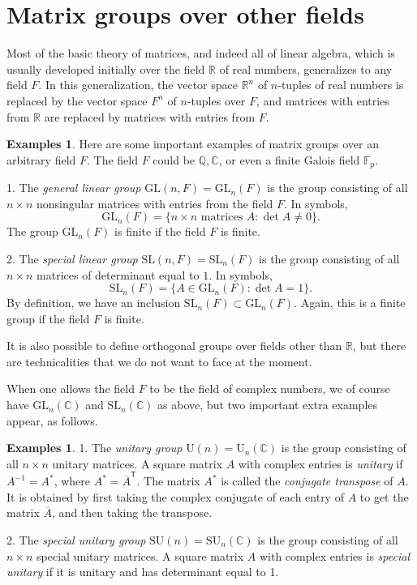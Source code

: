 \documentclass[11pt]{article}
\theoremstyle{definition}
\newtheorem{examples}[thm]{Examples}
\newcommand{\R}{\mathbb{R}} %
\newcommand{\C}{\mathbb{C}} %
\newcommand{\Q}{\mathbb{Q}} %
\newcommand{\F}{{\mathbb F}}
\newcommand{\GL}{\mathrm{GL}}
\newcommand{\SL}{\mathrm{SL}}
\newcommand{\U}{\mathrm{U}}
\newcommand{\SU}{\mathrm{SU}}
\newcommand{\transpose}{\mathsf{T}}
\begin{document}
\newpage
\section{Matrix groups over other fields}\noindent
Most of the basic theory of matrices, and indeed all of linear
algebra, which is usually developed initially over the field $\R$ of
real numbers, generalizes to any field $F$. In this
generalization, the vector space $\R^n$ of $n$-tuples of real numbers
is replaced by the vector space $F^n$ of $n$-tuples over $F$, and
matrices with entries from $\R$ are replaced by matrices with entries
from $F$.

\begin{examples}
Here are some important examples of matrix groups over an arbitrary
field $F$. The field $F$ could be $\Q, \C$, or even a finite Galois
field $\F_p$.

1. The \emph{general linear group}
$\GL(n,F) = \GL_n(F)$\index{GL@$\GL_n(F)$} is the group consisting of
all $n \times n$ nonsingular matrices with entries from the field
$F$. In symbols,
\[
  \GL_n(F) = \{ n \times n \text{ matrices } A : \det A \ne 0\}.
\]
The group $\GL_n(F)$ is finite if the field $F$ is finite. 

2. The \emph{special linear group} $\SL(n,
F) = \SL_n(F)$\index{SL@$\SL_n(F)$} is the group consisting of all $n
\times n$ matrices of determinant equal to $1$. In symbols,
\[
  \SL_n(F) = \{ A \in \GL_n(F) : \det A = 1 \}.
\]
By definition, we have an inclusion $\SL_n(F) \subset
\GL_n(F)$. Again, this is a finite group if the field $F$ is finite.
\end{examples}

It is also possible to define orthogonal
groups over fields other than $\R$, but there
are technicalities that we do not want to face at the moment.

When one allows the field $F$ to be the field of complex numbers, we
of course have $\GL_n(\C)$ and $\SL_n(\C)$ as above, but two important
extra examples appear, as follows.

\begin{examples}
1. The \emph{unitary group} $\U(n) =
\U_n(\C)$\index{U@$\U(n)$} is the group consisting of all $n \times
n$ unitary matrices. A square matrix $A$ with complex entries is
\emph{unitary} if $A^{-1} = A^*$, where $A^* =
\overline{A}^\transpose$. The matrix $A^*$ is called the
\emph{conjugate transpose} of $A$. It is obtained by first taking the
complex conjugate of each entry of $A$ to get the matrix
$\overline{A}$, and then taking the transpose.

2. The \emph{special unitary group}
$\SU(n) = \SU_n(\C)$\index{SU@$\SU(n)$} is the group consisting of all
$n \times n$ special unitary matrices. A square matrix $A$ with
complex entries is \emph{special unitary} if it is unitary and has
determinant equal to 1.
\end{examples}
\end{document}
